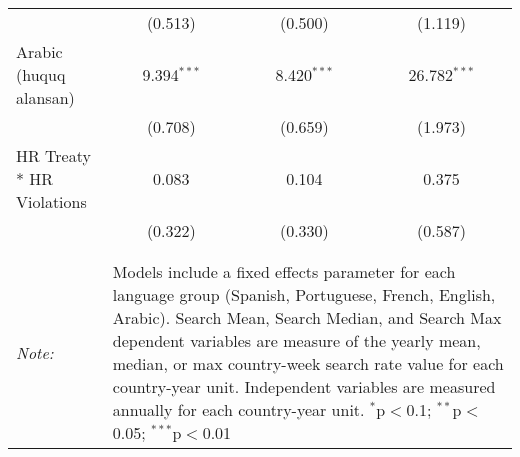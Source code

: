 \begin{table}[!htbp]
\begin{tabular}{@{\extracolsep{5pt}}lccc}
  & (0.513) & (0.500) & (1.119) \\ 
  Arabic (huquq alansan) & 9.394$^{***}$ & 8.420$^{***}$ & 26.782$^{***}$ \\ 
  & (0.708) & (0.659) & (1.973) \\ 
  HR Treaty * HR Violations & 0.083 & 0.104 & 0.375 \\ 
  & (0.322) & (0.330) & (0.587) \\ 
 \hline \\[-1.8ex] 
\hline 
\hline \\[-1.8ex] 
\textit{Note:}  & \multicolumn{3}{l}{\parbox[t]{8cm}{Models include a fixed effects parameter for each language group (Spanish, Portuguese, French, English, Arabic). Search Mean, Search Median, and Search Max dependent variables are measure of the yearly mean, median, or max country-week search rate value for each country-year unit. Independent variables are measured annually for each country-year unit. $^{*}$p$<$0.1; $^{**}$p$<$0.05; $^{***}$p$<$0.01}} \\ 
\end{tabular} 
\end{table} 
